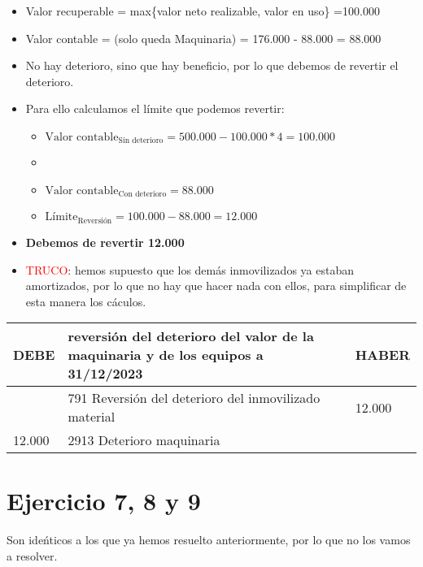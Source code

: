 \documentclass[a4paper,12pt]{article}
\newcommand{\fec}{31/12/}
\newcommand{\valorrecuperable}{Valor recuperable = max\{valor neto realizable, valor en uso\} =}
\newcommand{\VC}{Valor contable = }
\begin{document}
\begin{itemize}
    \item \valorrecuperable 100.000
    \item \VC (solo queda Maquinaria) = 176.000 - 88.000 = 88.000
    \item No hay deterioro, sino que hay beneficio, por lo que debemos de revertir el deterioro.
    \item Para ello calculamos el límite que podemos revertir:
    \begin{itemize}
        \item $\text{Valor contable}_{\text{Sin deterioro}} = 500.000 - 100.000*4 = 100.000$
        \item \item $\text{Valor contable}_{\text{Con deterioro}} = 88.000$
        \item $\text{Límite}_{\text{Reversión}} = 100.000 - 88.000 = 12.000$
    \end{itemize}
    \item \textbf{Debemos de revertir 12.000}
    \item \textcolor{red}{TRUCO}: hemos supuesto que los demás inmovilizados ya estaban amortizados, por lo que no hay que hacer nada con ellos, para simplificar de esta manera los cáculos.
\end{itemize}

\begin{table}[H]
    \centering
    \begin{tabular}{|p{3cm}|p{6cm}|p{3cm}|}
    \hline
    \textbf{DEBE} & \textbf{reversión del deterioro del valor de la maquinaria y de los equipos a \fec2023} & \textbf{HABER} \\
    \hline
    & 791 Reversión del deterioro del inmovilizado material &12.000 \\
    \hline
    12.000 & 2913 Deterioro maquinaria& \\
    \hline
    \end{tabular}
\end{table}

\section{Ejercicio 7, 8 y 9}

Son ideńticos a los que ya hemos resuelto anteriormente, por lo que no los vamos a resolver.
\end{document}
